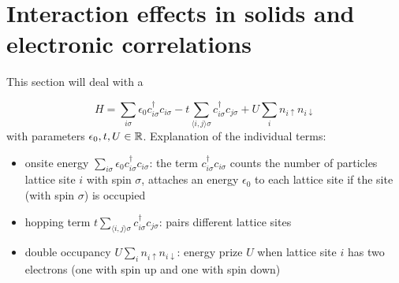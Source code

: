 \documentclass[../classnotes.tex]{subfiles}
\begin{document}
\chapter{Interaction effects in solids and electronic correlations}\label{ch:interaction-effects-in-solids-and-electronic-correlations}

This section will deal with a

\begin{equation}\label{eq:hubbard_hamiltonian}
    H = \sum_{i \sigma} \epsilon_0 c_{i \sigma}^{\dagger} c_{i \sigma} - t \sum_{\langle i,j \rangle \sigma} c_{i \sigma}^{\dagger} c_{j \sigma} + U \sum_i n_{i \uparrow} n_{i \downarrow}
\end{equation}
with parameters \(\epsilon_0, t, U \in \mathbb{R}\).
Explanation of the individual terms:
\begin{itemize}
    \item onsite energy \(\sum_{i \sigma} \epsilon_0 c_{i \sigma}^{\dagger} c_{i \sigma}\): the term \(c_{i \sigma}^{\dagger} c_{i \sigma}\) counts the number of particles lattice site \(i\) with spin \(\sigma\), attaches an energy \(\epsilon_0\) to each lattice site if the site (with spin \(\sigma\)) is occupied
    \item hopping term \(t \sum_{\langle i,j \rangle \sigma} c_{i \sigma}^{\dagger} c_{j \sigma}\): pairs different lattice sites
    \item double occupancy \(U \sum_i n_{i \uparrow} n_{i \downarrow}\): energy prize \(U\) when lattice site \(i\) has two electrons (one with spin up and one with spin down)
\end{itemize}
\end{document}
